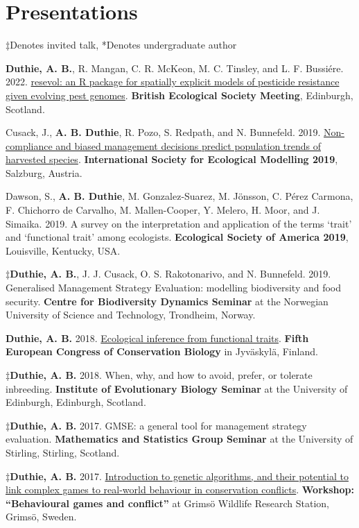 \documentclass[letterpaper]{article}
\renewenvironment{itemize}{
  \begin{list}{}{
    \setlength{\leftmargin}{1.5em}
  }
}{
  \end{list}
}
\begin{document}
\section*{Presentations}
\begin{itemize}
\item $\ddagger$Denotes invited talk, *Denotes undergraduate author
\item {\bf Duthie, A. B.}, R. Mangan, C. R. McKeon, M. C. Tinsley, and L. F. Bussi\'{e}re. 2022. \href{http://bradduthie.github.io/talks/BES2022.pdf}{resevol: an R package for spatially explicit models of pesticide resistance given evolving pest genomes}. {\bf British Ecological Society Meeting}, Edinburgh, Scotland.
\item Cusack, J., {\bf A. B. Duthie}, R. Pozo, S. Redpath, and N. Bunnefeld. 2019. \href{http://bradduthie.github.io/talks/duthie_ISEM_2019.pdf}{Non-compliance and biased management decisions predict population trends of harvested species}. {\bf International Society for Ecological Modelling 2019}, Salzburg, Austria.
\item Dawson, S., {\bf A. B. Duthie}, M. Gonzalez-Suarez, M. J\"{o}nsson, C. P\'{e}rez Carmona, F. Chichorro de Carvalho, M. Mallen-Cooper, Y. Melero, H. Moor, and J. Simaika. 2019. A survey on the interpretation and application of the terms `trait' and `functional trait' among ecologists. {\bf Ecological Society of America 2019}, Louisville, Kentucky, USA.
\item $\ddagger${\bf Duthie, A. B.}, J. J. Cusack, O. S. Rakotonarivo, and N. Bunnefeld. 2019. Generalised Management Strategy Evaluation: modelling biodiversity and food security. {\bf Centre for Biodiversity Dynamics Seminar} at the Norwegian University of Science and Technology, Trondheim, Norway.
\item {\bf Duthie, A. B.} 2018. \href{https://www.dropbox.com/s/v42iqdccpkyg55w/Duthie_ECCB2018.pdf?dl=0}{Ecological inference from functional traits}. {\bf Fifth European Congress of Conservation Biology} in Jyv\"{a}skyl\"{a}, Finland.
\item $\ddagger${\bf Duthie, A. B.} 2018. When, why, and how to avoid, prefer, or tolerate inbreeding. {\bf Institute of Evolutionary Biology Seminar} at the University of Edinburgh, Edinburgh, Scotland.
\item $\ddagger${\bf Duthie, A. B.} 2017. GMSE: a general tool for management strategy evaluation. {\bf Mathematics and Statistics Group Seminar} at the University of Stirling, Stirling, Scotland.
\item $\ddagger${\bf Duthie, A. B.} 2017. \href{https://bradduthie.shinyapps.io/GRIMSO}{Introduction to genetic algorithms, and their potential to link complex games to real-world behaviour in conservation conflicts}. {\bf Workshop: ``Behavioural games and conflict''} at Grims\"{o} Wildlife Research Station, Grims\"{o}, Sweden.

\end{itemize}
\end{document}
